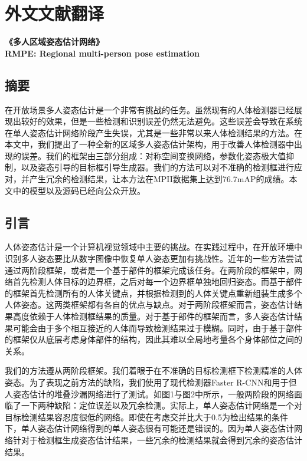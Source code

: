 \chapter{外文文献翻译}
{\centering
\begin{minipage}{\linewidth}
	\centering
	\xiaosan
	\bfseries
	《多人区域姿态估计网络》\\ 
	RMPE: Regional multi-person pose estimation
\end{minipage}
}
\label{cha:engtrans}
\section{摘要}
在开放场景多人姿态估计是一个非常有挑战的任务。虽然现有的人体检测器已经展现出较好的效果，但是一些检测和识别误差仍然无法避免。这些误差会导致在系统在单人姿态估计网络阶段产生失误，尤其是一些非常以来人体检测结果的方法。在本文中，我们提出了一种全新的区域多人姿态估计架构，用于改善人体检测器中出现的误差。我们的框架由三部分组成：对称空间变换网络，参数化姿态极大值抑制，以及姿态引导的目标框引导生成器。我们的方法可以对不准确的检测框进行应对，并产生冗余的检测结果，让本方法在MPII数据集上达到76.7mAP的成绩。本文中的模型以及源码已经向公众开放。

\section{引言}
人体姿态估计是一个计算机视觉领域中主要的挑战。在实践过程中，在开放环境中识别多人姿态要比从数字图像中恢复单人姿态更加有挑战性。近年的一些方法尝试通过两阶段框架，或者是一个基于部件的框架完成该任务。在两阶段的框架中，网络首先检测人体目标的边界框，之后对每一个边界框单独地回归姿态。而基于部件的框架首先检测所有的人体关键点，并根据检测到的人体关键点重新组装生成多个人体姿态。这两类框架都有各自的优点与缺点。对于两阶段框架而言，姿态估计结果高度依赖于人体检测框结果的质量。对于基于部件的框架而言，多人姿态估计结果可能会由于多个相互接近的人体而导致检测结果过于模糊。同时，由于基于部件的框架仅从底层考虑身体部件的结构，因此其难以全局地考量各个身体部位之间的关系。

我们的方法遵从两阶段框架。我们着眼于在不准确的目标检测框下检测精准的人体姿态。为了表现之前方法的缺陷，我们使用了现代检测器Faster R-CNN和用于但人姿态估计的堆叠沙漏网络进行了测试。如图1与图2中所示，一般两阶段的网络面临了一下两种缺陷：定位误差以及冗余检测。实际上，单人姿态估计网络是一个对目标检测结果容忍度很低的网络。即使在考虑交并比大于0.5为检出结果的条件下，单人姿态估计网络得到的单人姿态很有可能还是错误的。因为单人姿态估计网络针对于检测框生成姿态估计结果，一些冗余的检测结果就会得到冗余的姿态估计结果。

